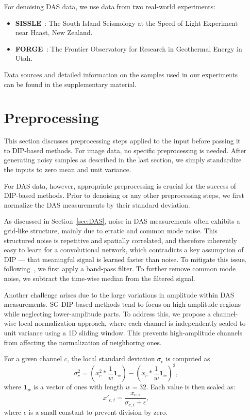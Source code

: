 For denoising DAS data, we use data from two real-world experiments:
\begin{itemize}
    \item \textbf{SISSLE}~\cite{SISSLE}: The South Island Seismology at the Speed of Light Experiment near Haast, New Zealand.
    \item \textbf{FORGE}~\cite{FORGE}: The Frontier Observatory for Research in Geothermal Energy in Utah.
\end{itemize}
Data sources and detailed information on the samples used in our experiments can be found in the supplementary material.

\section{Preprocessing}

This section discusses preprocessing steps applied to the input before passing it to DIP-based methods.
For image data, no specific preprocessing is needed.
After generating noisy samples as described in the last section, we simply standardize the inputs to zero mean and unit variance.

For DAS data, however, appropriate preprocessing is crucial for the success of DIP-based methods.
Prior to denoising or any other preprocessing steps, we first normalize the DAS measurements by their standard deviation.

As discussed in Section~\ref{sec:DAS}, noise in DAS measurements often exhibits a grid-like structure, mainly due to erratic and common mode noise.
This structured noise is repetitive and spatially correlated, and therefore inherently easy to learn for a convolutional network, which contradicts a key assumption of DIP --- that meaningful signal is learned faster than noise.
To mitigate this issue, following~\cite{IDF}, we first apply a band-pass filter.
To further remove common mode noise, we subtract the time-wise median from the filtered signal.

Another challenge arises due to the large variations in amplitude within DAS measurements.  
SG-DIP-based methods tend to focus on high-amplitude regions while neglecting lower-amplitude parts.  
To address this, we propose a channel-wise local normalization approach, where each channel is independently scaled to unit variance using a 1D sliding window.  
This prevents high-amplitude channels from affecting the normalization of neighboring ones.  

For a given channel $c$, the local standard deviation $\sigma_c$ is computed as
\begin{equation}
    \sigma_c^2 = \left( x_c^2 * \frac{1}{w} \mathbf{1}_w \right) - \left( x_c * \frac{1}{w} \mathbf{1}_w \right)^2,
\end{equation}
where $\mathbf{1}_w$ is a vector of ones with length $w=32$.
Each value is then scaled as:  
\begin{equation}
    x'_{c,i} = \frac{x_{c,i}}{\sigma_{c,i} + \epsilon},
\end{equation}
where $\epsilon$ is a small constant to prevent division by zero.

